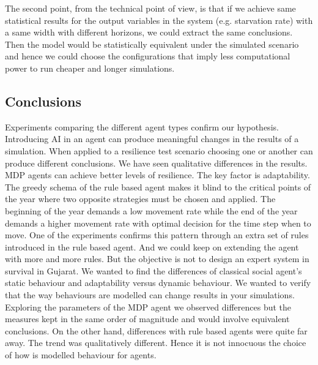 \documentclass[11pt,oneside,a4paper,openright]{report}
\begin{document}
The second point, from the technical point of view, is that if we achieve same statistical results for the output variables in the system (e.g. starvation rate) with a same width with different horizons, we could extract the same conclusions. Then the model would be statistically equivalent under the simulated scenario and hence we could choose the configurations that imply less computational power to run cheaper and longer simulations.


\subsection{Conclusions}

	
Experiments comparing the different agent types confirm our hypothesis. Introducing AI in an agent can produce
meaningful changes in the results of a simulation. When applied to a resilience test scenario choosing
one or another can produce different conclusions. We have seen qualitative differences in the results. MDP agents can achieve better levels of resilience. The key factor is adaptability. The greedy schema of the 
rule based agent makes it blind to the critical points of the year where two opposite strategies must be
chosen and applied. The beginning of the year demands a low movement rate while the end of the year demands
a higher movement rate with optimal decision for the time step when to move. One of the experiments confirms this pattern through an extra set of rules introduced in the rule based agent. And we could keep on extending the agent with more and more rules. But the objective is not to design an expert system in survival in Gujarat. We wanted to find the differences of classical social agent's static behaviour and adaptability versus dynamic behaviour. We wanted to verify that the way behaviours are modelled can change results in your simulations. Exploring the parameters of the MDP agent we observed differences but the measures kept in the same order of magnitude and would involve equivalent conclusions. On the other hand, differences with rule based agents were quite far away. The trend was qualitatively different. Hence it is not innocuous the choice of how is modelled behaviour for agents.
\end{document}
